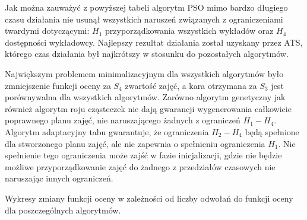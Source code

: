 \par Jak można zauważyć z powyższej tabeli algorytm PSO mimo bardzo długiego czasu działania nie usunął wszystkich naruszeń związanych z ograniczeniami twardymi dotyczącymi: ${H}_{1}$ przyporządkowania wszystkich wykładów oraz $H_{4}$ dostępności wykładowcy. Najlepszy rezultat działania został uzyskany przez ATS, którego czas działania był najkrótszy w stosunku do pozostałych algorytmów. 
\par Największym problemem minimalizacyjnym dla wszystkich algorytmów było zmniejszenie funkcji oceny za $S_{4}$ zwartość zajęć, a kara otrzymana za $S_{3}$ jest porównywalna dla wszystkich algorytmów. 
Zarówno algorytm genetyczny jak również algorytm roju cząsteczek nie dają gwarancji wygenerowania całkowicie poprawnego planu zajęć, nie naruszającego żadnych z ograniczeń $H_{1}-H_{4}$. Algorytm adaptacyjny tabu gwarantuje, że ograniczenia $H_{2}-H_{4}$ będą spełnione dla stworzonego planu zajęć, ale nie zapewnia o spełnieniu ograniczenia ${H}_{1}$. Nie spełnienie tego ograniczenia może zajść w fazie inicjalizacji, gdzie nie będzie możliwe przyporządkowanie zajęć do żadnego z przedziałów czasowych nie naruszając innych ograniczeń.
\par  Wykresy zmiany funkcji oceny w zależności od liczby odwołań do funkcji oceny dla poszczególnych algorytmów.
